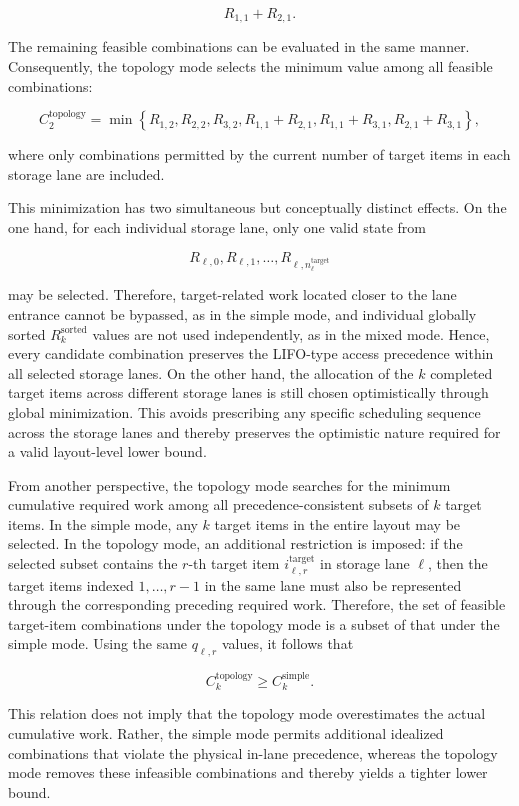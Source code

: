 \[
R_{1,1}
+
R_{2,1}.
\]

The remaining feasible combinations can be evaluated in the same manner.
Consequently, the topology mode selects the minimum value among all feasible
combinations:

\[
C_2^{\mathrm{topology}}
=
\min
\left\{
R_{1,2},
R_{2,2},
R_{3,2},
R_{1,1}+R_{2,1},
R_{1,1}+R_{3,1},
R_{2,1}+R_{3,1}
\right\},
\]

where only combinations permitted by the current number of target items in each
storage lane are included.

This minimization has two simultaneous but conceptually distinct effects. On
the one hand, for each individual storage lane, only one valid state from

\[
R_{\ell,0},
R_{\ell,1},
\ldots,
R_{\ell,n_{\ell}^{\mathrm{target}}}
\]

may be selected. Therefore, target-related work located closer to the lane
entrance cannot be bypassed, as in the simple mode, and individual globally
sorted \(R_k^{\mathrm{sorted}}\) values are not used independently, as in the
mixed mode. Hence, every candidate combination preserves the LIFO-type access
precedence within all selected storage lanes. On the other hand, the allocation
of the \(k\) completed target items across different storage lanes is still
chosen optimistically through global minimization. This avoids prescribing any
specific scheduling sequence across the storage lanes and thereby preserves the
optimistic nature required for a valid layout-level lower bound.

From another perspective, the topology mode searches for the minimum cumulative
required work among all precedence-consistent subsets of \(k\) target items.
In the simple mode, any \(k\) target items in the entire layout may be selected.
In the topology mode, an additional restriction is imposed: if the selected
subset contains the \(r\)-th target item
\(i^{\mathrm{target}}_{\ell,r}\) in storage lane \(\ell\), then the target items
indexed \(1,\ldots,r-1\) in the same lane must also be represented through the
corresponding preceding required work. Therefore, the set of feasible
target-item combinations under the topology mode is a subset of that under the
simple mode. Using the same \(q_{\ell,r}\) values, it follows that

\[
C_k^{\mathrm{topology}}
\geq
C_k^{\mathrm{simple}}.
\]

This relation does not imply that the topology mode overestimates the actual
cumulative work. Rather, the simple mode permits additional idealized
combinations that violate the physical in-lane precedence, whereas the topology
mode removes these infeasible combinations and thereby yields a tighter lower
bound.

